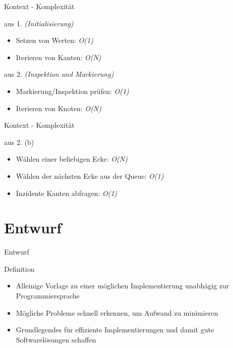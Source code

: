 \documentclass{beamer}
\begin{document}
    \begin{frame}{Kontext - Komplexit\"at}
        \begin{block}{aus 1. \textit{(Initialisierung)}}
            \begin{itemize}
                \item Setzen von Werten: \textit{O(1)}
                \item Iterieren von Kanten: \textit{O(N)}
            \end{itemize}
        \end{block}
        \begin{block}{aus 2. \textit{(Inspektion und Markierung)}}
            \begin{itemize}
                \item Markierung/Inspektion pr\"ufen: \textit{O(1)}
                \item Iterieren von Knoten: \textit{O(N)}
            \end{itemize}
        \end{block}
    \end{frame}

    \begin{frame}{Kontext - Komplexit\"at}
        \begin{block}{aus 2. (b)}
            \begin{itemize}
                \item W\"ahlen einer beliebigen Ecke: \textit{O(N)}
                \item W\"ahlen der n\"achsten Ecke aus der Queue: \textit{O(1)}
                \item Inzidente Kanten abfragen: \textit{O(1)}
            \end{itemize}
        \end{block}
    \end{frame}

    \section{Entwurf}
    \begin{frame}{Entwurf}
        \begin{block}{Definition}
            \begin{itemize}
                \item Alleinige Vorlage zu einer m\"oglichen Implementierung unabh\"agig zur Programmiersprache
                \item M\"ogliche Probleme schnell erkennen, um Aufwand zu minimieren
                \item Grundlegendes f\"ur effiziente Implementierungen und damit gute Softwarel\"osungen schaffen
            \end{itemize}
        \end{block}
    \end{frame}
\end{document}
